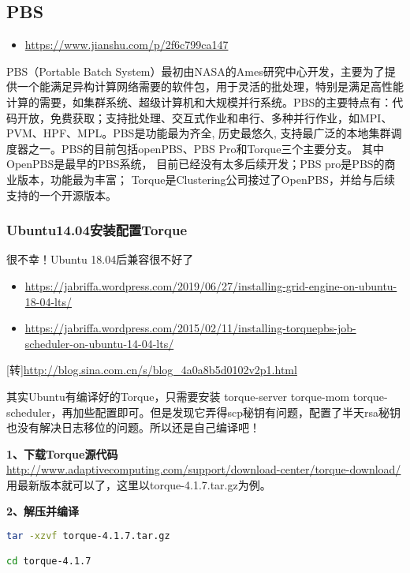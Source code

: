{\subsection{PBS}
\begin{itemize}
\item \url{https://www.jianshu.com/p/2f6c799ca147}
\end{itemize}


PBS（Portable Batch System）最初由NASA的Ames研究中心开发，主要为了提供一个能满足异构计算网络需要的软件包，用于灵活的批处理，特别是满足高性能计算的需要，如集群系统、超级计算机和大规模并行系统。PBS的主要特点有：代码开放，免费获取；支持批处理、交互式作业和串行、多种并行作业，如MPI、PVM、HPF、MPL。PBS是功能最为齐全, 历史最悠久, 支持最广泛的本地集群调度器之一。PBS的目前包括openPBS、PBS Pro和Torque三个主要分支。 其中OpenPBS是最早的PBS系统， 目前已经没有太多后续开发；PBS pro是PBS的商业版本，功能最为丰富； Torque是Clustering公司接过了OpenPBS，并给与后续支持的一个开源版本。


\subsubsection{Ubuntu14.04安装配置Torque}
{\color{red} 很不幸！Ubuntu 18.04后兼容很不好了}
\begin{itemize}
\item \url{https://jabriffa.wordpress.com/2019/06/27/installing-grid-engine-on-ubuntu-18-04-lts/}
\item \url{https://jabriffa.wordpress.com/2015/02/11/installing-torquepbs-job-scheduler-on-ubuntu-14-04-lts/}
\end{itemize}


[转]\url{http://blog.sina.com.cn/s/blog_4a0a8b5d0102v2p1.html}

其实Ubuntu有编译好的Torque，只需要安装 torque-server torque-mom torque-scheduler，再加些配置即可。但是发现它弄得scp秘钥有问题，配置了半天rsa秘钥也没有解决日志移位的问题。所以还是自己编译吧！

\textbf{1、下载Torque源代码}\\
\url{http://www.adaptivecomputing.com/support/download-center/torque-download/}\\
用最新版本就可以了，这里以torque-4.1.7.tar.gz为例。

\textbf{2、解压并编译}

\begin{lstlisting}[language=sh]
tar -xzvf torque-4.1.7.tar.gz

cd torque-4.1.7


\end{lstlisting}}
